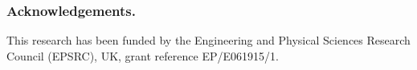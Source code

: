 \documentclass{llncs}
\begin{document}
\subsubsection*{Acknowledgements. } 
This research has been funded by the Engineering and Physical Sciences Research Council (EPSRC), UK, grant reference EP/E061915/1.
\end{document}
